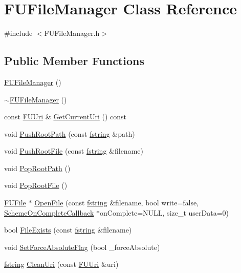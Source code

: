 \hypertarget{classFUFileManager}{
\section{FUFileManager Class Reference}
\label{classFUFileManager}
}


{\ttfamily \#include $<$FUFileManager.h$>$}

\subsection*{Public Member Functions}
\begin{DoxyCompactItemize}
\item 
\hyperlink{classFUFileManager_ad2166d067dee17eae2c1d02189b081e9}{FUFileManager} ()
\item 
\hyperlink{classFUFileManager_a0b57fe99ae0e90996efaf55c595a2664}{$\sim$FUFileManager} ()
\item 
const \hyperlink{classFUUri}{FUUri} \& \hyperlink{classFUFileManager_a8c737c86433cf22fb443d131bf9d43cb}{GetCurrentUri} () const 
\item 
void \hyperlink{classFUFileManager_a83ad0cc17dcaa60f6cbedf70a7f9d698}{PushRootPath} (const \hyperlink{classfm_1_1stringT}{fstring} \&path)
\item 
void \hyperlink{classFUFileManager_af466233666b2255c31055d1e035586d1}{PushRootFile} (const \hyperlink{classfm_1_1stringT}{fstring} \&filename)
\item 
void \hyperlink{classFUFileManager_a5cfb553e3404880367e37b52e1912fa5}{PopRootPath} ()
\item 
void \hyperlink{classFUFileManager_aabe9887b5414ffa5dfb73d9c16f35777}{PopRootFile} ()
\item 
\hyperlink{classFUFile}{FUFile} $\ast$ \hyperlink{classFUFileManager_aa749c50d033ca53bca555cdb2ca78252}{OpenFile} (const \hyperlink{classfm_1_1stringT}{fstring} \&filename, bool write=false, \hyperlink{classIFunctor2}{SchemeOnCompleteCallback} $\ast$onComplete=NULL, size\_\-t userData=0)
\item 
bool \hyperlink{classFUFileManager_a574498a8a4f6743f6a67241367303bbe}{FileExists} (const \hyperlink{classfm_1_1stringT}{fstring} \&filename)
\item 
void \hyperlink{classFUFileManager_a870b7582e4c6ae3aacd18c0fad3ea4a5}{SetForceAbsoluteFlag} (bool \_\-forceAbsolute)
\item 
\hyperlink{classfm_1_1stringT}{fstring} \hyperlink{classFUFileManager_a05c034c9118a3a72bb67bf98b3980733}{CleanUri} (const \hyperlink{classFUUri}{FUUri} \&uri)

\end{DoxyCompactItemize}
